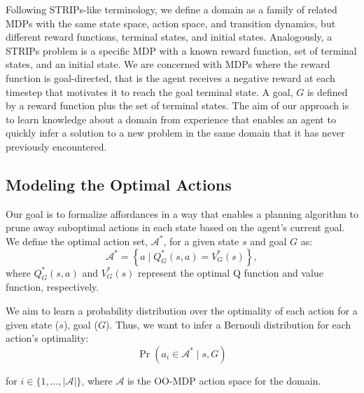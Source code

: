 \documentclass[letterpaper]{article}
\begin{document}
Following STRIPs-like terminology, we define a domain as a family of
related MDPs with the same state space, action space, and transition
dynamics, but different reward functions, terminal states, and initial
states.  Analogously, a
STRIPs problem is a specific MDP with a known reward function, set
of terminal states, and an initial state.  We are
concerned with MDPs where the reward function is goal-directed, that
is the agent receives a negative reward at each timestep that motivates
it to reach the goal terminal state.  A goal, $G$ is
defined by a reward function plus the set of terminal states.  The aim
of our approach is to learn knowledge about a domain from experience
that enables an agent to quickly infer a solution to a new problem in
the same domain that it has never previously encountered.


\subsection{Modeling the Optimal Actions}

Our goal is to formalize affordances in a way that enables a planning
algorithm to prune away suboptimal actions in each state based on the
agent's current goal. We define the optimal action set,
$\mathcal{A}^*$, for a given state $s$ and goal $G$ as:
\begin{equation}
\mathcal{A}^* = \left\{ a \mid Q^*_G(s,a) = V^*_G(s) \right\}, 
\label{eq:opt_act_set}
\end{equation}
where $Q^*_G(s,a)$ and $V^*_G(s)$ represent the optimal Q function and 
value function, respectively.

We aim to learn a probability distribution over the optimality of each action
for a given state ($s$), goal ($G$). Thus, we want to infer a Bernouli
distribution for each action's optimality:
\begin{equation}
\Pr(a_i \in \mathcal{A}^* \mid s, G)
\label{eq:master}
\end{equation}

\noindent for $i \in \{1, \ldots, |\mathcal{A}|\}$, where
$\mathcal{A}$ is the OO-MDP action space for the domain.
\end{document}
